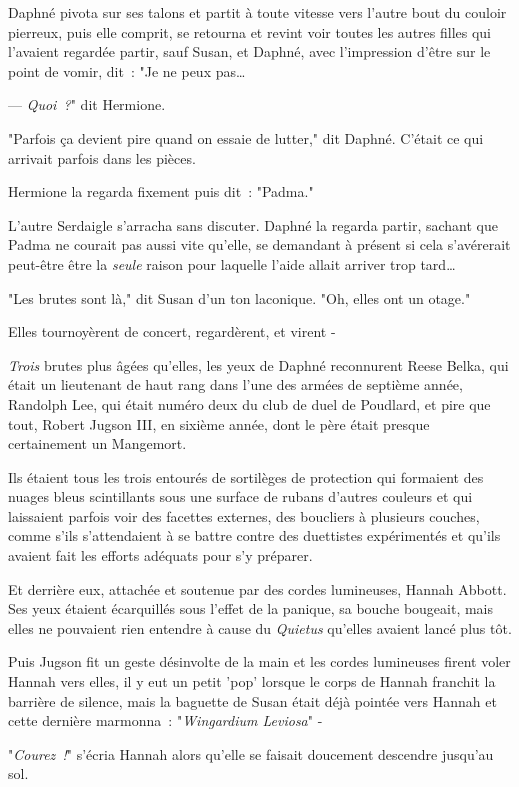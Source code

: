 Daphné pivota sur ses talons et partit à toute vitesse vers l'autre bout du couloir pierreux, puis elle comprit, se retourna et revint voir toutes les autres filles qui l'avaient regardée partir, sauf Susan, et Daphné, avec l'impression d'être sur le point de vomir, dit~: "Je ne peux pas…

--- \emph{Quoi~?}" dit Hermione.

"Parfois ça devient pire quand on essaie de lutter," dit Daphné. C'était ce qui arrivait parfois dans les pièces.

Hermione la regarda fixement puis dit~: "Padma."

L'autre Serdaigle s'arracha sans discuter. Daphné la regarda partir, sachant que Padma ne courait pas aussi vite qu'elle, se demandant à présent si cela s'avérerait peut-être être la \emph{seule} raison pour laquelle l'aide allait arriver trop tard…

"Les brutes sont là," dit Susan d'un ton laconique. "Oh, elles ont un otage."

Elles tournoyèrent de concert, regardèrent, et virent -

\emph{Trois} brutes plus âgées qu'elles, les yeux de Daphné reconnurent Reese Belka, qui était un lieutenant de haut rang dans l'une des armées de septième année, Randolph Lee, qui était numéro deux du club de duel de Poudlard, et pire que tout, Robert Jugson III, en sixième année, dont le père était presque certainement un Mangemort.

Ils étaient tous les trois entourés de sortilèges de protection qui formaient des nuages bleus scintillants sous une surface de rubans d'autres couleurs et qui laissaient parfois voir des facettes externes, des boucliers à plusieurs couches, comme s'ils s'attendaient à se battre contre des duettistes expérimentés et qu'ils avaient fait les efforts adéquats pour s'y préparer.

Et derrière eux, attachée et soutenue par des cordes lumineuses, Hannah Abbott. Ses yeux étaient écarquillés sous l'effet de la panique, sa bouche bougeait, mais elles ne pouvaient rien entendre à cause du \emph{Quietus} qu'elles avaient lancé plus tôt.

Puis Jugson fit un geste désinvolte de la main et les cordes lumineuses firent voler Hannah vers elles, il y eut un petit 'pop' lorsque le corps de Hannah franchit la barrière de silence, mais la baguette de Susan était déjà pointée vers Hannah et cette dernière marmonna~: "\emph{Wingardium Leviosa}" -

"\emph{Courez~!}" s'écria Hannah alors qu'elle se faisait doucement descendre jusqu'au sol.

